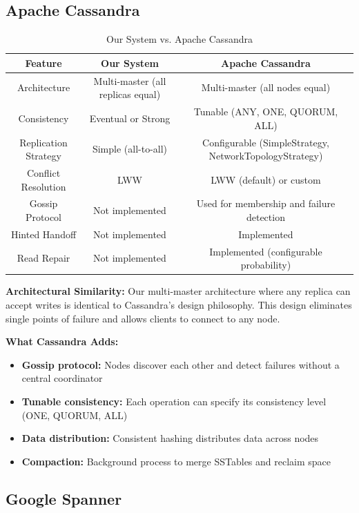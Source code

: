 \documentclass[10pt,a4paper]{article}
\begin{document}
\subsection{Apache Cassandra}

\begin{table}[H]
\centering
\caption{Our System vs. Apache Cassandra}
\begin{tabular}{|c|c|c|}
\hline
\textbf{Feature} & \textbf{Our System} & \textbf{Apache Cassandra} \\
\hline
Architecture & Multi-master (all replicas equal) & Multi-master (all nodes equal) \\
\hline
Consistency & Eventual or Strong & Tunable (ANY, ONE, QUORUM, ALL) \\
\hline
Replication Strategy & Simple (all-to-all) & Configurable (SimpleStrategy, NetworkTopologyStrategy) \\
\hline
Conflict Resolution & LWW & LWW (default) or custom \\
\hline
Gossip Protocol & Not implemented & Used for membership and failure detection \\
\hline
Hinted Handoff & Not implemented & Implemented \\
\hline
Read Repair & Not implemented & Implemented (configurable probability) \\
\hline
\end{tabular}
\end{table}

\textbf{Architectural Similarity:} Our multi-master architecture where any replica can accept writes is identical to Cassandra's design philosophy. This design eliminates single points of failure and allows clients to connect to any node.

\textbf{What Cassandra Adds:}
\begin{itemize}
    \item \textbf{Gossip protocol:} Nodes discover each other and detect failures without a central coordinator
    \item \textbf{Tunable consistency:} Each operation can specify its consistency level (ONE, QUORUM, ALL)
    \item \textbf{Data distribution:} Consistent hashing distributes data across nodes
    \item \textbf{Compaction:} Background process to merge SSTables and reclaim space
\end{itemize}

\subsection{Google Spanner}
\end{document}
